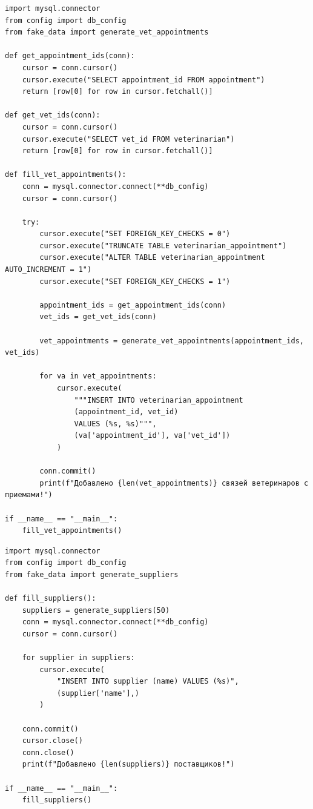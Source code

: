 \documentclass[a4paper]{article}
\begin{document}
\begin{lstlisting}[caption = Заполнение таблицы Veterinarian and appointment, basicstyle= \scriptsize \ttfamily]
import mysql.connector
from config import db_config
from fake_data import generate_vet_appointments

def get_appointment_ids(conn):
    cursor = conn.cursor()
    cursor.execute("SELECT appointment_id FROM appointment")
    return [row[0] for row in cursor.fetchall()]

def get_vet_ids(conn):
    cursor = conn.cursor()
    cursor.execute("SELECT vet_id FROM veterinarian")
    return [row[0] for row in cursor.fetchall()]

def fill_vet_appointments():
    conn = mysql.connector.connect(**db_config)
    cursor = conn.cursor()
    
    try:
        cursor.execute("SET FOREIGN_KEY_CHECKS = 0")
        cursor.execute("TRUNCATE TABLE veterinarian_appointment")
        cursor.execute("ALTER TABLE veterinarian_appointment AUTO_INCREMENT = 1")
        cursor.execute("SET FOREIGN_KEY_CHECKS = 1")

        appointment_ids = get_appointment_ids(conn)
        vet_ids = get_vet_ids(conn)

        vet_appointments = generate_vet_appointments(appointment_ids, vet_ids)
        
        for va in vet_appointments:
            cursor.execute(
                """INSERT INTO veterinarian_appointment 
                (appointment_id, vet_id)
                VALUES (%s, %s)""",
                (va['appointment_id'], va['vet_id'])
            )
        
        conn.commit()
        print(f"Добавлено {len(vet_appointments)} связей ветеринаров с приемами!")

if __name__ == "__main__":
    fill_vet_appointments()
\end{lstlisting}

\begin{lstlisting}[caption = Заполнение таблицы Supplier, basicstyle= \scriptsize \ttfamily]
import mysql.connector
from config import db_config
from fake_data import generate_suppliers

def fill_suppliers():
    suppliers = generate_suppliers(50)
    conn = mysql.connector.connect(**db_config)
    cursor = conn.cursor()

    for supplier in suppliers:
        cursor.execute(
            "INSERT INTO supplier (name) VALUES (%s)",
            (supplier['name'],)
        )
    
    conn.commit()
    cursor.close()
    conn.close()
    print(f"Добавлено {len(suppliers)} поставщиков!")

if __name__ == "__main__":
    fill_suppliers()
\end{lstlisting}
\end{document}
